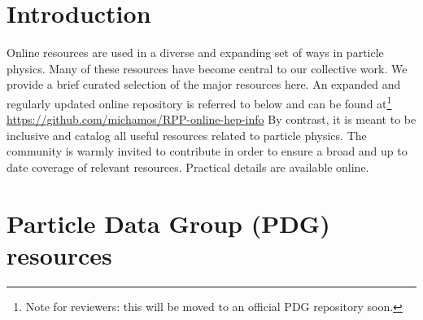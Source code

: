 \section{Introduction}\label{databases:sec:introduction}
Online resources are used in a diverse and expanding set of ways in particle physics. 
Many of these resources have become central to our collective work. We provide a brief curated selection of the major resources here. An expanded and regularly
updated online repository is referred to below and can be found at\footnote{Note for reviewers: this will be moved to an official PDG repository soon.} \url{https://github.com/michamos/RPP-online-hep-info} 
By contrast, it is meant to be inclusive and catalog all useful resources related to particle physics. The community is warmly invited to contribute in order to ensure a broad and up to date coverage of relevant resources. Practical details are available online.

\section{Particle Data Group (PDG)
resources}\label{databases:sec:resources}

